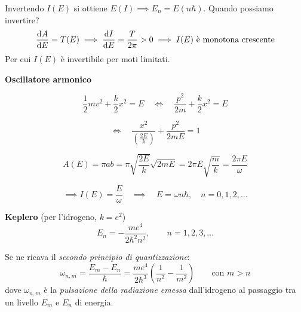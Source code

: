 Invertendo $I(E )$ si ottiene $E(I )\implies E_n=E(n\hbar)$. Quando possiamo invertire? 
\begin{equation}
    \dv{A}{E}= T(E )\implies \dv{I}{E}= \frac{T}{2\pi}>0 \implies I(E ) \text{ è monotona crescente}
\end{equation}
Per cui $I(E )$ è invertibile per moti limitati.

\begin{example}
    \textbf{Oscillatore armonico}

    \begin{equation*}
        \frac{1}{2}mv^2 + \frac{k}{2}x^2 = E \quad \iff \quad \frac{p^2}{2m} + \frac{k}{2}x^2 = E
    \end{equation*}

    \begin{equation*}
        \iff \quad \frac{x^2}{\left( \frac{2E}{k} \right)} + \frac{p^2}{2mE} = 1
    \end{equation*}

    \begin{equation*}
        A(E) = \pi a b = \pi \sqrt{\frac{2E}{k}} \sqrt{2mE} = 2\pi E \sqrt{\frac{m}{k}} = \frac{2\pi E}{\omega}
    \end{equation*}

    \begin{equation*}
        \implies I(E) = \frac{E}{\omega} \quad \implies \quad E = \omega n \hbar, \quad n = 0,1,2,\dots
    \end{equation*}
\end{example}

\begin{example}
    \textbf{Keplero} \quad (per l'idrogeno, $k = e^2$)
    \begin{equation*}
        E_n = -\frac{m e^4}{2 \hbar^2 n^2}, \qquad n = 1,2,3,\dots
    \end{equation*}
\end{example}

\begin{proposition}
    Se ne ricava il \textit{secondo principio di quantizzazione}:
    \begin{equation*}
        \omega_{n,m} = \frac{E_m - E_n}{\hbar} = \frac{m e^4}{2 \hbar^3} \left( \frac{1}{n^2} - \frac{1}{m^2} \right) \qquad \text{con } m > n
    \end{equation*}
    dove $\omega_{n,m}$ è la \textit{pulsazione della radiazione emessa} dall'idrogeno al passaggio tra un livello $E_m$ e $E_n$ di energia.
\end{proposition}



